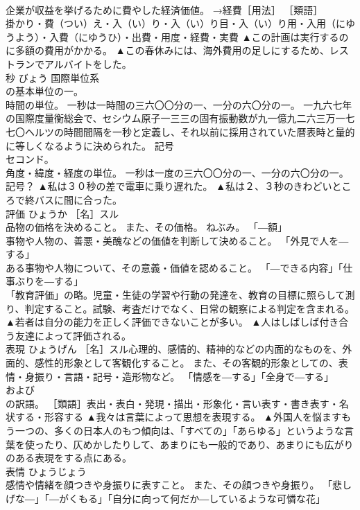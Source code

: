 \documentclass[8pt]{extreport}
\begin{document}
\begin{CJK}{UTF8}{min}
\\	企業が収益を挙げるために費やした経済価値。 →経費［用法］ ［類語］
\\	掛かり・費（つい）え・入（い）り・入（い）り目・入（い）り用・入用（にゆうよう）・入費（にゆうひ）・出費・用度・経費・実費	▲この計画は実行するのに多額の費用がかかる。 ▲この春休みには、海外費用の足しにするため、レストランでアルバイトをした。
\\	秒	びょう	国際単位系
\\	の基本単位の一。 
\\	時間の単位。 一秒は一時間の三六〇〇分の一、一分の六〇分の一。 一九六七年の国際度量衡総会で、セシウム原子一三三の固有振動数が九一億九二六三万一七七〇ヘルツの時間間隔を一秒と定義し、それ以前に採用されていた暦表時と量的に等しくなるように決められた。 記号
\\	セコンド。 
\\	角度・緯度・経度の単位。 一秒は一度の三六〇〇分の一、一分の六〇分の一。 記号？	▲私は３０秒の差で電車に乗り遅れた。 ▲私は２、３秒のきわどいところで終バスに間に合った。
\\	評価	ひょうか	［名］スル 
\\	品物の価格を決めること。 また、その価格。 ねぶみ。 「―額」 
\\	事物や人物の、善悪・美醜などの価値を判断して決めること。 「外見で人を―する」 
\\	ある事物や人物について、その意義・価値を認めること。 「―できる内容」「仕事ぶりを―する」 
\\	「教育評価」の略。児童・生徒の学習や行動の発達を、教育の目標に照らして測り、判定すること。試験、考査だけでなく、日常の観察による判定を含まれる。	▲若者は自分の能力を正しく評価できないことが多い。 ▲人はしばしば付き合う友達によって評価される。
\\	表現	ひょうげん	［名］スル心理的、感情的、精神的などの内面的なものを、外面的、感性的形象として客観化すること。 また、その客観的形象としての、表情・身振り・言語・記号・造形物など。 「情感を―する」「全身で―する」 
\\	および
\\	の訳語。 ［類語］表出・表白・発現・描出・形象化・言い表す・書き表す・名状する・形容する	▲我々は言葉によって思想を表現する。 ▲外国人を悩ますもう一つの、多くの日本人のもつ傾向は、「すべての」「あらゆる」というような言葉を使ったり、仄めかしたりして、あまりにも一般的であり、あまりにも広がりのある表現をする点にある。
\\	表情	ひょうじょう	
\\	感情や情緒を顔つきや身振りに表すこと。 また、その顔つきや身振り。 「悲しげな―」「―がくもる」「自分に向って何だか―しているような可憐な花」 

\end{CJK}
\end{document}
